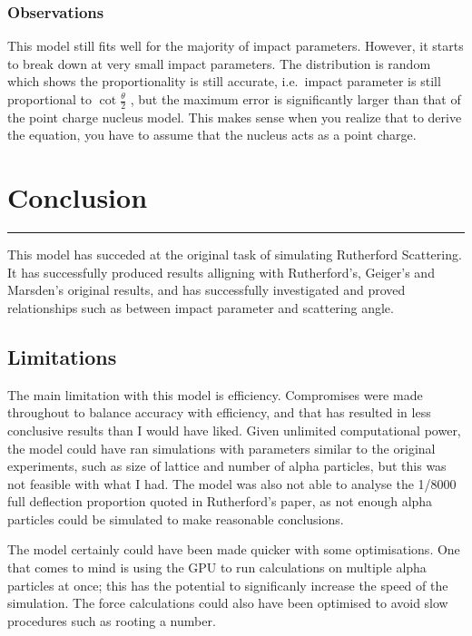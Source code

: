 \documentclass[11pt]{article}
\begin{document}
    \hypertarget{observations}{%
\subsubsection*{Observations}\label{observations}}

This model still fits well for the majority of impact parameters.
However, it starts to break down at very small impact parameters. The
distribution is random which shows the proportionality is still
accurate, i.e.~impact parameter is still proportional to
\(\cot\frac{\theta}{2}\) , but the maximum error is significantly larger
than that of the point charge nucleus model. This makes sense when you
realize that to derive the equation, you have to assume that the nucleus
acts as a point charge.

\pagebreak
    \hypertarget{conclusion}{%
\section{Conclusion}\label{conclusion}}

\begin{center}\rule{0.5\linewidth}{0.5pt}\end{center}

This model has succeded at the original task of simulating Rutherford
Scattering. It has successfully produced results alligning with
Rutherford's, Geiger's and Marsden's original results, and has
successfully investigated and proved relationships such as between
impact parameter and scattering angle.

\hypertarget{limitations}{%
\subsection{Limitations}\label{limitations}}

The main limitation with this model is efficiency. Compromises were made
throughout to balance accuracy with efficiency, and that has resulted in
less conclusive results than I would have liked. Given unlimited
computational power, the model could have ran simulations with
parameters similar to the original experiments, such as size of lattice
and number of alpha particles, but this was not feasible with what I
had. The model was also not able to analyse the 1/8000 full deflection
proportion quoted in Rutherford's paper, as not enough alpha particles
could be simulated to make reasonable conclusions.

The model certainly could have been made quicker with some
optimisations. One that comes to mind is using the GPU to run
calculations on multiple alpha particles at once; this has the potential
to significanly increase the speed of the simulation. The force
calculations could also have been optimised to avoid slow procedures
such as rooting a number.
\end{document}
